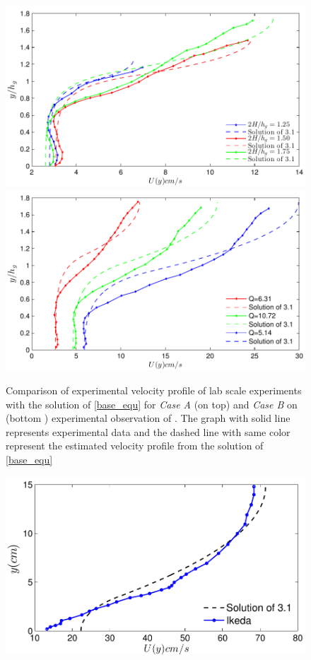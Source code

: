 \documentclass[12pt]{report}   %
\begin{document}
\begin{figure}
 {\includegraphics[]{Vivoni_Fig3_6_zero_shear_match}\\
 \includegraphics{Vivoni_Fig3_7_zero_shear_match}}
 \caption{Comparison of experimental velocity profile of lab scale experiments with the solution of \eqref{base_equ} for \textit{Case A } (on top) and \textit{Case B} on (bottom ) experimental observation of \cite{Vivoni98}. The graph with solid line represents experimental data and the dashed line with same color represent the estimated velocity profile from the solution of \eqref{base_equ}  }
 \label{VivoniFig}
\end{figure}
\begin{figure}
 \includegraphics{Ikeda_zero_shear_match}
\end{figure}
\end{document}
